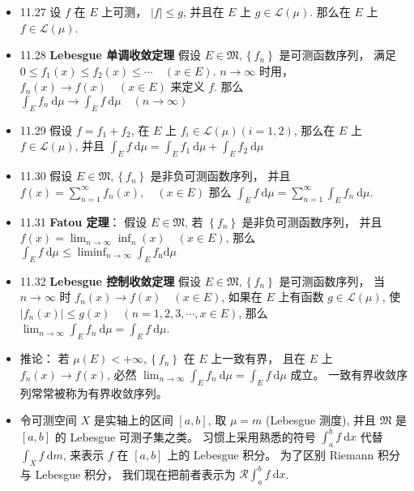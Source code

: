 \begin{itemize}
\item 11.27 设 $f$ 在 $E$ 上可测， $|f| \leqslant g$, 并且在 $E$ 上 $g \in \mathscr{L}(\mu)$. 那么在 $E$ 上 $f \in \mathscr{L}(\mu)$.

\item 11.28 \textbf{Lebesgue 单调收敛定理} 假设 $E \in \mathfrak{M},\left\{f_{n}\right\}$ 是可测函数序列， 满足 $0 \leqslant f_{1}(x) \leqslant f_{2}(x) \leqslant \cdots \quad(x \in E)$. $n \rightarrow \infty$ 时用， $f_{n}(x) \rightarrow f(x) \quad(x \in E)$ 来定义 $f$. 那么 $\int_{E} f_{n} \mathrm{~d} \mu \rightarrow \int_{E} f \mathrm{~d} \mu \quad(n \rightarrow \infty)$

\item 11.29 假设 $f=f_{1}+f_{2}$, 在 $E$ 上 $f_{i} \in \mathscr{L}(\mu)(i=1,2)$, 那么在 $E$ 上 $f \in \mathscr{L}(\mu)$, 并且 $\int_{E} f \mathrm{~d} \mu=\int_{E} f_{1} \mathrm{~d} \mu+\int_{E} f_{2} \mathrm{~d} \mu$

\item 11.30 假设 $E \in \mathfrak{M},\left\{f_{n}\right\}$ 是非负可测函数序列， 并且 $f(x)=\sum_{n=1}^{\infty} f_{n}(x), \quad(x \in E)$ 那么 $\int_{E} f \mathrm{~d} \mu=\sum_{n=1}^{\infty} \int_{E} f_{n} \mathrm{~d} \mu$.

\item 11.31 \textbf{Fatou 定理}： 假设 $E \in \mathfrak{M}$, 若 $\left\{f_{n}\right\}$ 是非负可测函数序列， 并且 $f(x)=\lim _{n \rightarrow \infty} \inf _{n}(x) \quad(x \in E)$, 那么 $\int_{E} f \mathrm{~d} \mu \leqslant \liminf _{n \rightarrow \infty} \int_{E} f_{\mathrm{n}} \mathrm{d} \mu$

\item 11.32 \textbf{Lebesgue 控制收敛定理} 假设 $E \in \mathfrak{M},\left\{f_{n}\right\}$ 是可测函数序列， 当 $n \rightarrow \infty$ 时 $f_{n}(x) \rightarrow f(x) \quad(x \in E)$, 如果在 $E$ 上有函数 $g \in \mathscr{L}(\mu)$, 使 $\left|f_{n}(x)\right| \leqslant g(x) \quad(n=1,2,3, \cdots, x \in E)$, 那么 $\lim _{n \rightarrow \infty} \int_{E} f_{n} \mathrm{~d} \mu=\int_{E} f \mathrm{~d} \mu$.

\item 推论： 若 $\mu(E)<+\infty,\left\{f_{n}\right\}$ 在 $E$ 上一致有界， 且在 $E$ 上 $f_{n}(x) \rightarrow f(x)$, 必然 $\lim _{n \rightarrow \infty} \int_{E} f_{n} \mathrm{~d} \mu=\int_{E} f \mathrm{~d} \mu$ 成立。 一致有界收敛序列常常被称为有界收敛序列。

\item 令可测空间 $X$ 是实轴上的区间 $[a, b]$, 取 $\mu=m$ (Lebesgue 测度), 并且 $\mathfrak{M}$ 是 $[a, b]$ 的 Lebesgue 可测子集之类。 习惯上采用熟悉的符号 $\int_{a}^{b} f \mathrm{~d} x$ 代替 $\int_{X} f \mathrm{~d} m$, 来表示 $f$ 在 $[a, b]$ 上的 Lebesgue 积分。 为了区别 Riemann 积分与 Lebesgue 积分， 我们现在把前者表示为 $\mathscr{R} \int_{a}^{b} f \mathrm{~d} x$.


\end{itemize}
